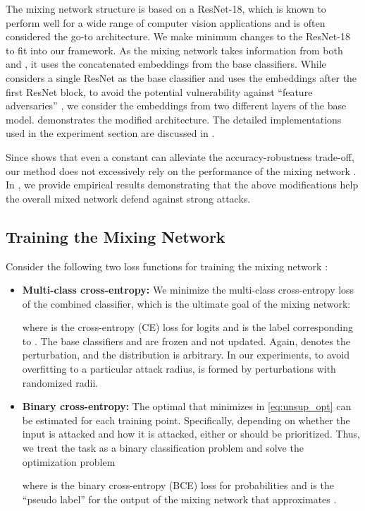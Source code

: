 \documentclass[11pt, letterpaper]{article}
\theoremstyle{plain}
\theoremstyle{definition}
\begin{document}
The mixing network structure is based on a ResNet-18, which is known to perform well for a wide range of computer vision applications and is often considered the go-to architecture. We make minimum changes to the ResNet-18 to fit into our framework. As the mixing network takes information from both  and , it uses the concatenated embeddings from the base classifiers. While \citep{Metzen17} considers a single ResNet as the base classifier and uses the embeddings after the first ResNet block, to avoid the potential vulnerability against ``feature adversaries'' \citep{Sabour15}, we consider the embeddings from two different layers of the base model.  demonstrates the modified architecture. The detailed implementations used in the experiment section are discussed in .

Since  shows that even a constant  can alleviate the accuracy-robustness trade-off, our method does not excessively rely on the performance of the mixing network . In , we provide empirical results demonstrating that the above modifications help the overall mixed network defend against strong attacks.


\subsection{Training the Mixing Network} \label{sec:train_mixing_network}

Consider the following two loss functions for training the mixing network :
\begin{itemize}[leftmargin=6mm]
\setlength\itemsep{1pt}
    \item \textbf{Multi-class cross-entropy:} We minimize the multi-class cross-entropy loss of the combined classifier, which is the ultimate goal of the mixing network:
    
    where  is the cross-entropy (CE) loss for logits and  is the label corresponding to . The base classifiers  and  are frozen and not updated. Again,  denotes the perturbation, and the distribution  is arbitrary. In our experiments, to avoid overfitting to a particular attack radius,  is formed by perturbations with randomized radii.  
    
    \item \textbf{Binary cross-entropy:} The optimal  that minimizes  in \cref{eq:unsup_opt} can be estimated for each training point. Specifically, depending on whether the input is attacked and how it is attacked, either  or  should be prioritized. Thus, we treat the task as a binary classification problem and solve the optimization problem
    
    where  is the binary cross-entropy (BCE) loss for probabilities and  is the ``pseudo label'' for the output of the mixing network that approximates .
\end{itemize}
\end{document}
